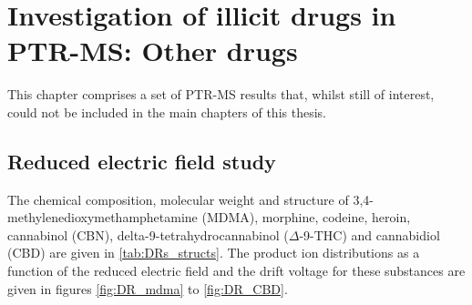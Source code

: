 \chapter{Investigation of illicit drugs in PTR-MS: Other drugs}\label{chapter:drugs}

This chapter comprises a set of PTR-MS results that, whilst still of interest, could not be included in the main chapters of this thesis.


\section{Reduced electric field study}
The chemical composition, molecular weight and structure of 
3,4-methylenedioxymethamphetamine (MDMA),
morphine, 
codeine, 
heroin, 
cannabinol (CBN), 
delta-9-tetrahydrocannabinol ($\Delta$-9-THC)
and 
cannabidiol (CBD)
are given in \autoref{tab:DRs_structs}.
%
The product ion distributions as a function of the reduced electric field and the drift voltage for these substances are given in  figures \ref{fig:DR_mdma} to \ref{fig:DR_CBD}.


